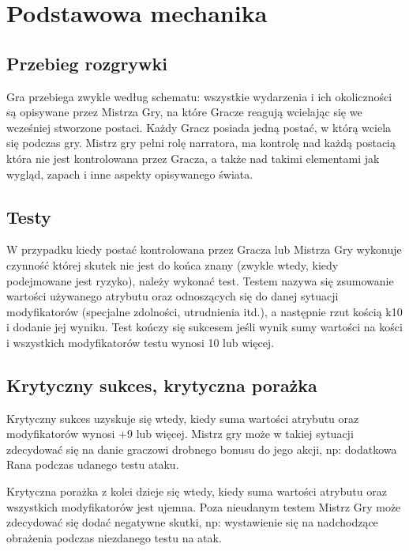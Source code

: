 \documentclass[10pt,a4paper]{book}
\begin{document}
\section{Podstawowa mechanika}
\begin{multicols}{2}

\subsection*{Przebieg rozgrywki}
Gra przebiega zwykle według schematu: wszystkie wydarzenia i ich okoliczności są opisywane przez Mistrza Gry, na które Gracze reagują wcielając się we wcześniej stworzone postaci. Każdy Gracz posiada jedną postać, w którą wciela się podczas gry. Mistrz gry pełni rolę narratora, ma kontrolę nad każdą postacią która nie jest kontrolowana przez Gracza, a także nad takimi elementami jak wygląd, zapach i inne aspekty opisywanego świata.


\subsection*{Testy}
W przypadku kiedy postać kontrolowana przez Gracza lub Mistrza Gry wykonuje czynność której skutek nie jest do końca znany (zwykle wtedy, kiedy podejmowane jest ryzyko), należy wykonać test. Testem nazywa się zsumowanie wartości używanego atrybutu oraz odnoszących się do danej sytuacji modyfikatorów (specjalne zdolności, utrudnienia itd.), a następnie rzut kością k10 i dodanie jej wyniku. Test kończy się sukcesem jeśli wynik sumy wartości na kości i wszystkich modyfikatorów testu wynosi 10 lub więcej.


\subsection*{Krytyczny sukces, krytyczna porażka}
Krytyczny sukces uzyskuje się wtedy, kiedy suma wartości atrybutu oraz modyfikatorów wynosi +9 lub więcej. Mistrz gry może w takiej sytuacji zdecydować się na danie graczowi drobnego bonusu do jego akcji, np: dodatkowa Rana podczas udanego testu ataku.

Krytyczna porażka z kolei dzieje się wtedy, kiedy suma wartości atrybutu oraz wszystkich modyfikatorów jest ujemna. Poza nieudanym testem Mistrz Gry może zdecydować się dodać negatywne skutki, np: wystawienie się na nadchodzące obrażenia podczas niezdanego testu na atak.

\end{multicols}
\end{document}

